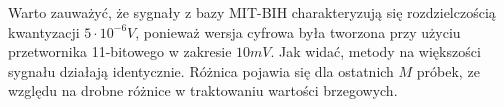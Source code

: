 Warto zauważyć, że sygnały z bazy MIT-BIH charakteryzują się rozdzielczością kwantyzacji $5 \cdot 10^{-6} V$, ponieważ wersja cyfrowa była tworzona przy użyciu przetwornika 11-bitowego w zakresie $10 mV$. Jak widać, metody na większości sygnału działają identycznie. Różnica pojawia się dla ostatnich $M$ próbek, ze względu na drobne różnice w traktowaniu wartości brzegowych.